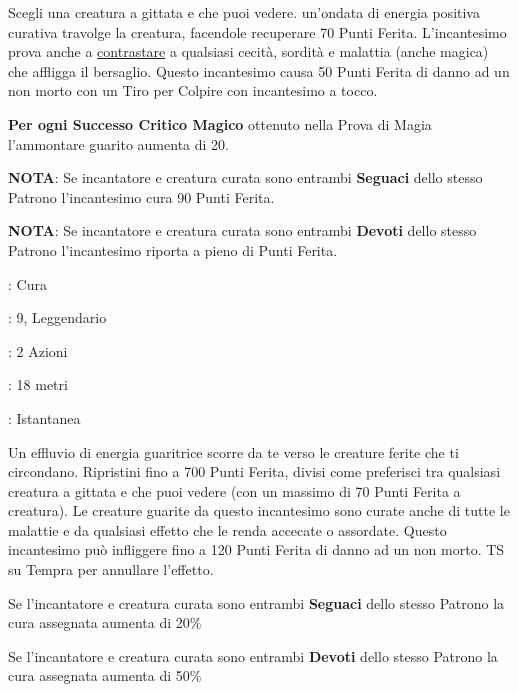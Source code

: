 \begin{multicols}{2}
Scegli una creatura a gittata e che puoi vedere. un'ondata di energia positiva curativa travolge la creatura, facendole recuperare 70 Punti Ferita. L'incantesimo prova anche a \hyperlink{contrastareincantesimi}{contrastare} a qualsiasi cecità, sordità e malattia (anche magica) che affligga il bersaglio. Questo incantesimo causa 50 Punti Ferita di danno ad un non morto con un Tiro per Colpire con incantesimo a tocco.

\textbf{Per ogni Successo Critico Magico} ottenuto nella Prova di Magia l'ammontare guarito aumenta di 20.

\textbf{NOTA}: Se incantatore e creatura curata sono entrambi \textbf{Seguaci} dello stesso Patrono l'incantesimo cura 90 Punti Ferita.

\textbf{NOTA}: Se incantatore e creatura curata sono entrambi \textbf{Devoti} dello stesso Patrono l'incantesimo riporta a pieno di Punti Ferita.

\noindent\colorbox{OBSSgold!10}{
\begin{minipage}{0.95\linewidth}
\begin{description}[noitemsep, topsep=0pt, parsep=0pt, partopsep=0pt, leftmargin=0cm, labelwidth=1.3cm]
	\item[\textbf{Lista}]: Cura
	\item[\textbf{Livello}]: 9, Leggendario
	\item[\textbf{Lancio}]: 2 Azioni
	\item[\textbf{Gittata}]: 18 metri
	\item[\textbf{Durata}]: Istantanea
\end{description}
\end{minipage}}\smallskip

Un effluvio di energia guaritrice scorre da te verso le creature ferite che ti circondano. Ripristini fino a 700 Punti Ferita, divisi come preferisci tra qualsiasi creatura a gittata e che puoi vedere (con un massimo di 70 Punti Ferita a creatura). Le creature guarite da questo incantesimo sono curate anche di tutte le malattie e da qualsiasi effetto che le renda accecate o assordate. Questo incantesimo può infliggere fino a 120 Punti Ferita di danno ad un non morto. TS su Tempra per annullare l'effetto.

Se l'incantatore e creatura curata sono entrambi \textbf{Seguaci} dello stesso Patrono la cura assegnata aumenta di 20\%

Se l'incantatore e creatura curata sono entrambi \textbf{Devoti} dello stesso Patrono la cura assegnata aumenta di 50\%


\end{multicols}
